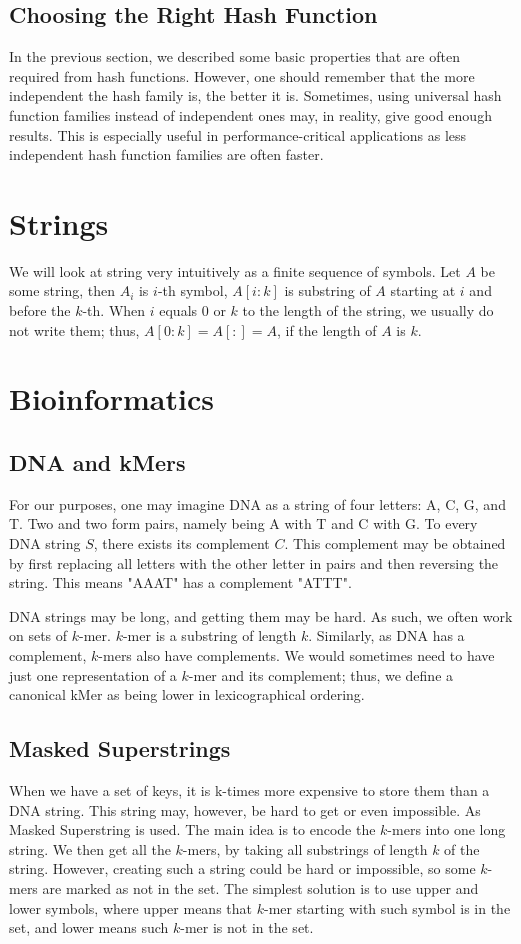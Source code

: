 \subsection{Choosing the Right Hash Function}
In the previous section, we described some basic properties that are often required from hash functions. However, one should remember that the more independent the hash family is, the better it is. Sometimes, using universal hash function families instead of independent ones may, in reality, give good enough results. This is especially useful in performance-critical applications as less independent hash function families are often faster.

\section{Strings}
We will look at string very intuitively as a finite sequence of symbols. Let $A$ be some string, then $A_i$ is $i$-th symbol, $A[i:k]$ is substring of $A$ starting at $i$ and before the $k$-th. When $i$ equals $0$ or $k$ to the length of the string, we usually do not write them; thus, $A[0:k] = A[:] = A$, if the length of $A$ is $k$.

\section{Bioinformatics}
\subsection{DNA and kMers}
For our purposes, one may imagine DNA as a string of four letters: A, C, G, and T. Two and two form pairs, namely being A with T and C with G. To every DNA string $S$, there exists its complement $C$. This complement may be obtained by first replacing all letters with the other letter in pairs and then reversing the string. This means "AAAT" has a complement "ATTT".

DNA strings may be long, and getting them may be hard. As such, we often work on sets of $k$-mer. $k$-mer is a substring of length $k$. Similarly, as DNA has a complement, $k$-mers also have complements. We would sometimes need to have just one representation of a $k$-mer and its complement; thus, we define a canonical kMer as being lower in lexicographical ordering.

\subsection{Masked Superstrings}

When we have a set of keys, it is k-times more expensive to store them than a DNA string. This string may, however, be hard to get or even impossible. As Masked Superstring is used. 
The main idea is to encode the $k$-mers into one long string. We then get all the $k$-mers, by taking all substrings of length $k$ of the string. However, creating such a string could be hard or impossible, so some $k$-mers are marked as not in the set. The simplest solution is to use upper and lower symbols, where upper means that $k$-mer starting with such symbol is in the set, and lower means such $k$-mer is not in the set. 
\cite{Sladký}



